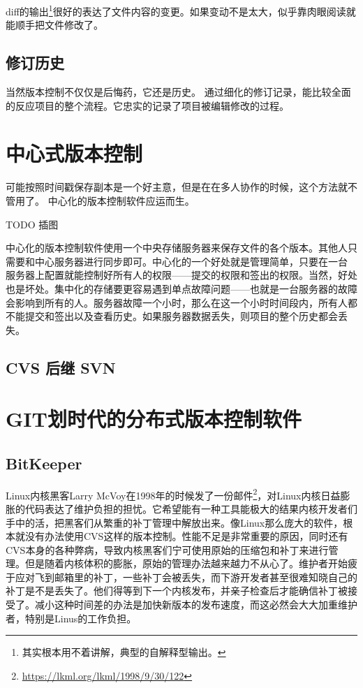 diff的输出\footnote{其实根本用不着讲解，典型的自解释型输出。}很好的表达了文件内容的变更。如果变动不是太大，似乎靠肉眼阅读就能顺手把文件修改了。

\subsection{修订历史}

当然版本控制不仅仅是后悔药，它还是历史。
通过细化的修订记录，能比较全面的反应项目的整个流程。它忠实的记录了项目被编辑修改的过程。


\section{中心式版本控制}

可能按照时间戳保存副本是一个好主意，但是在在多人协作的时候，这个方法就不管用了。
中心化的版本控制软件应运而生。

TODO 插图

中心化的版本控制软件使用一个中央存储服务器来保存文件的各个版本。其他人只需要和中心服务器进行同步即可。中心化的一个好处就是管理简单，只要在一台 服务器上配置就能控制好所有人的权限——提交的权限和签出的权限。当然，好处也是坏处。集中化的存储要更容易遇到单点故障问题——也就是一台服务器的故障会影响到所有的人。服务器故障一个小时，那么在这一个小时时间段内，所有人都不能提交和签出以及查看历史。如果服务器数据丢失，则项目的整个历史都会丢失。


\subsection{CVS 后继 SVN}

\section{GIT划时代的分布式版本控制软件}\label{sec:git}
 
\subsection{BitKeeper}

Linux内核黑客Larry McVoy在1998年的时候发了一份邮件\footnote{\url{https://lkml.org/lkml/1998/9/30/122}}，对Linux内核日益膨胀的代码表达了维护负担的担忧。它希望能有一种工具能极大的结果内核开发者们手中的活，把黑客们从繁重的补丁管理中解放出来。像Linux那么庞大的软件，根本就没有办法使用CVS这样的版本控制。性能不足是非常重要的原因，同时还有CVS本身的各种弊病，导致内核黑客们宁可使用原始的压缩包和补丁来进行管理。但是随着内核体积的膨胀，原始的管理办法越来越力不从心了。维护者开始疲于应对飞到邮箱里的补丁，一些补丁会被丢失，而下游开发者甚至很难知晓自己的补丁是不是丢失了。他们得等到下一个内核发布，并亲子检查后才能确信补丁被接受了。减小这种时间差的办法是加快新版本的发布速度，而这必然会大大加重维护者，特别是Linus的工作负担。

